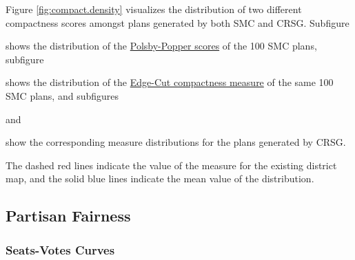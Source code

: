 Figure \ref{fig:compact.density} visualizes the distribution of two different compactness scores amongst plans generated by both SMC and CRSG. Subfigure
\begin{seriate} 
    \item shows the distribution of the \hyperref[sec:polsbypopper]{Polsby-Popper scores} of the 100 SMC plans, subfigure
    \item shows the distribution of the \hyperref[sec:edgecut]{Edge-Cut compactness measure} of the same 100 SMC plans, and subfigures
    \item and 
    \item show the corresponding measure distributions for the plans generated by CRSG. 
\end{seriate}
The dashed red lines indicate the value of the measure for the existing district map, and the solid blue lines indicate the mean value of the distribution. 

\subsection{Partisan Fairness}

\subsubsection{Seats-Votes Curves}


